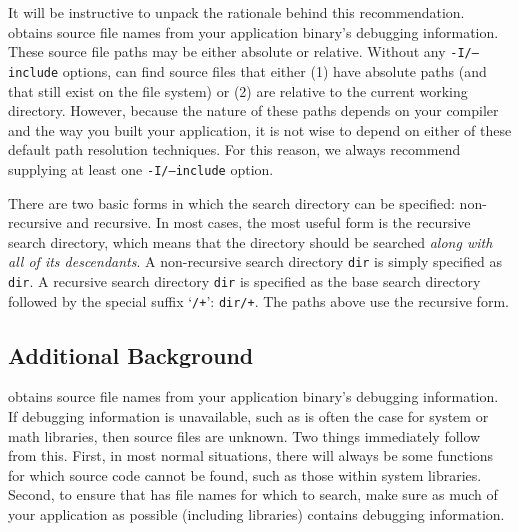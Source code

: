 \documentclass[11pt,letterpaper]{report}
\begin{document}
It will be instructive to unpack the rationale behind this recommendation.
\hpcprofAll{} obtains source file names from your application binary's debugging information.
These source file paths may be either absolute or relative.
Without any \texttt{-I/--include} options, \hpcprofAll{} can find source files that either (1) have absolute paths (and that still exist on the file system) or (2) are relative to the current working directory.
However, because the nature of these paths depends on your compiler and the way you built your application, it is not wise to depend on either of these default path resolution techniques.
For this reason, we always recommend supplying at least one \texttt{-I/--include} option.

There are two basic forms in which the search directory can be specified: non-recursive and recursive.
In most cases, the most useful form is the recursive search directory, which means that the directory should be searched \emph{along with all of its descendants}.
A non-recursive search directory \texttt{dir} is simply specified as \texttt{dir}.
A recursive search directory \texttt{dir} is specified as the base search directory followed by the special suffix `\texttt{/+}': \texttt{dir/+}.
The paths above use the recursive form.



\subsection{Additional Background}

\hpcprofAll{} obtains source file names from your application binary's debugging information.
If debugging information is unavailable, such as is often the case for system or math libraries, then source files are unknown.
Two things immediately follow from this.
First, in most normal situations, there will always be some functions for which source code cannot be found, such as those within system libraries.
Second, to ensure that \hpcprofAll{} has file names for which to search, make sure as much of your application as possible (including libraries) contains debugging information.
\end{document}
